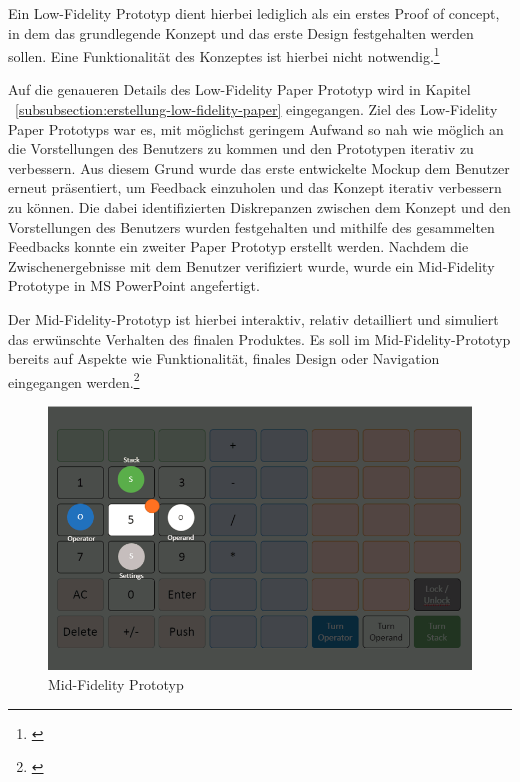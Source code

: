 
Ein Low-Fidelity Prototyp dient hierbei lediglich als ein erstes Proof of concept, in dem das grundlegende Konzept und das erste Design festgehalten werden sollen. Eine Funktionalität des Konzeptes ist hierbei nicht notwendig.\footnote{\cite[vgl.][S.~204]{jhammondtgrossjwesson2002}}

Auf die genaueren Details des Low-Fidelity Paper Prototyp wird in Kapitel ~\ref{subsubsection:erstellung-low-fidelity-paper} eingegangen. Ziel des Low-Fidelity Paper Prototyps war es, mit möglichst geringem Aufwand so nah wie möglich an die Vorstellungen des Benutzers zu kommen und den Prototypen iterativ zu verbessern. Aus diesem Grund wurde das erste entwickelte Mockup dem Benutzer erneut präsentiert, um Feedback einzuholen und das Konzept iterativ verbessern zu können. Die dabei identifizierten Diskrepanzen zwischen dem Konzept und den Vorstellungen des Benutzers wurden festgehalten und mithilfe des gesammelten Feedbacks konnte ein zweiter Paper Prototyp erstellt werden. Nachdem die Zwischenergebnisse mit dem Benutzer verifiziert wurde, wurde ein Mid-Fidelity Prototype in MS PowerPoint angefertigt.

Der Mid-Fidelity-Prototyp ist hierbei interaktiv, relativ detailliert und simuliert das erwünschte Verhalten des finalen Produktes. Es soll im Mid-Fidelity-Prototyp bereits auf Aspekte wie Funktionalität, finales Design oder Navigation eingegangen werden.\footnote{\cite[vgl.][S.~204]{jhammondtgrossjwesson2002}}


\begin{figure}[!h]
	\includegraphics[width=1\columnwidth]{img/planung-mid-fidelity}
	\caption[Mid-Fidelity Prototyp]{Mid-Fidelity Prototyp\footnotemark}
\end{figure}

